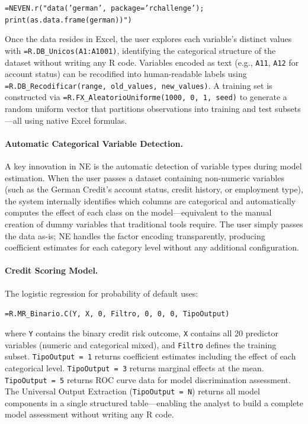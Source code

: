 \documentclass[preprint,12pt,authoryear]{elsarticle}
\newcommand{\neven}{NE\raisebox{0.2ex}{v}\rotatebox[origin=c]{180}{E}\rotatebox[origin=c]{180}{N}}
\begin{document}
\begin{center}
\texttt{=NEVEN.r("data('german', package='rchallenge'); print(as.data.frame(german))")}
\end{center}

Once the data resides in Excel, the user explores each variable's distinct values with \texttt{=R.DB\_Unicos(A1:A1001)}, identifying the categorical structure of the dataset without writing any R code. Variables encoded as text (e.g., \texttt{A11}, \texttt{A12} for account status) can be recodified into human-readable labels using \texttt{=R.DB\_Recodificar(range, old\_values, new\_values)}. A training set is constructed via \texttt{=R.FX\_AleatorioUniforme(1000, 0, 1, seed)} to generate a random uniform vector that partitions observations into training and test subsets---all using native Excel formulas.

\paragraph{Automatic Categorical Variable Detection.}
A key innovation in \neven{} is the automatic detection of variable types during model estimation. When the user passes a dataset containing non-numeric variables (such as the German Credit's account status, credit history, or employment type), the system internally identifies which columns are categorical and automatically computes the effect of each class on the model---equivalent to the manual creation of dummy variables that traditional tools require. The user simply passes the data as-is; \neven{} handles the factor encoding transparently, producing coefficient estimates for each category level without any additional configuration.

\paragraph{Credit Scoring Model.}
The logistic regression for probability of default uses:

\begin{center}
\texttt{=R.MR\_Binario.C(Y, X, 0, Filtro, 0, 0, 0, TipoOutput)}
\end{center}

where \texttt{Y} contains the binary credit risk outcome, \texttt{X} contains all 20 predictor variables (numeric and categorical mixed), and \texttt{Filtro} defines the training subset. \texttt{TipoOutput = 1} returns coefficient estimates including the effect of each categorical level. \texttt{TipoOutput = 3} returns marginal effects at the mean. \texttt{TipoOutput = 5} returns ROC curve data for model discrimination assessment. The Universal Output Extraction (\texttt{TipoOutput = N}) returns all model components in a single structured table---enabling the analyst to build a complete model assessment without writing any R code.
\end{document}
